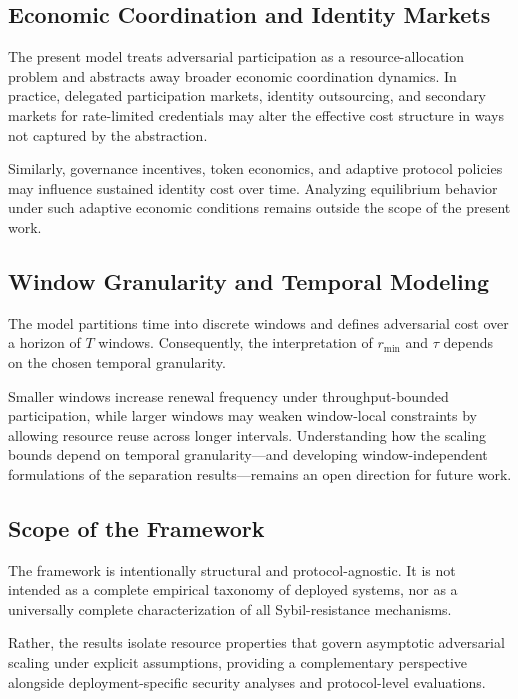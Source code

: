 \documentclass[journal]{IEEEtran}
\begin{document}
	\subsection{Economic Coordination and Identity Markets}
	
	The present model treats adversarial participation as a
	resource-allocation problem and abstracts away broader
	economic coordination dynamics.
	In practice, delegated participation markets,
	identity outsourcing, and secondary markets for
	rate-limited credentials may alter the effective cost
	structure in ways not captured by the abstraction.
	
	Similarly, governance incentives, token economics,
	and adaptive protocol policies may influence sustained
	identity cost over time.
	Analyzing equilibrium behavior under such adaptive
	economic conditions remains outside the scope of the
	present work.
	
	\subsection{Window Granularity and Temporal Modeling}
	
	The model partitions time into discrete windows and
	defines adversarial cost over a horizon of $T$ windows.
	Consequently, the interpretation of $r_{\min}$ and
	$\tau$ depends on the chosen temporal granularity.
	
	Smaller windows increase renewal frequency under
	throughput-bounded participation, while larger windows
	may weaken window-local constraints by allowing resource
	reuse across longer intervals.
	Understanding how the scaling bounds depend on temporal
	granularity—and developing window-independent formulations
	of the separation results—remains an open direction for
	future work.
	
	\subsection{Scope of the Framework}
	
	The framework is intentionally structural and
	protocol-agnostic.
	It is not intended as a complete empirical taxonomy
	of deployed systems, nor as a universally complete
	characterization of all Sybil-resistance mechanisms.
	
	Rather, the results isolate resource properties that
	govern asymptotic adversarial scaling under explicit
	assumptions, providing a complementary perspective
	alongside deployment-specific security analyses and
	protocol-level evaluations.
	
\end{document}
